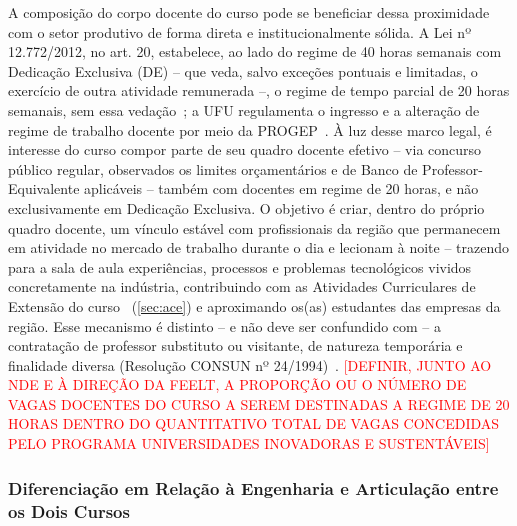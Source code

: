 A composição do corpo docente do curso pode se beneficiar dessa proximidade com o setor produtivo de forma direta e institucionalmente sólida. A Lei nº 12.772/2012, no art. 20, estabelece, ao lado do regime de 40 horas semanais com Dedicação Exclusiva (DE) -- que veda, salvo exceções pontuais e limitadas, o exercício de outra atividade remunerada --, o regime de tempo parcial de 20 horas semanais, sem essa vedação~\cite{lei_12772_2012}; a UFU regulamenta o ingresso e a alteração de regime de trabalho docente por meio da PROGEP~\cite{ufu_progep_regime_trabalho}. À luz desse marco legal, é interesse do curso compor parte de seu quadro docente efetivo -- via concurso público regular, observados os limites orçamentários e de Banco de Professor-Equivalente aplicáveis -- também com docentes em regime de 20 horas, e não exclusivamente em Dedicação Exclusiva. O objetivo é criar, dentro do próprio quadro docente, um vínculo estável com profissionais da região que permanecem em atividade no mercado de trabalho durante o dia e lecionam à noite -- trazendo para a sala de aula experiências, processos e problemas tecnológicos vividos concretamente na indústria, contribuindo com as Atividades Curriculares de Extensão do curso~\cite{ufu_congrad_177_2026} (\autoref{sec:ace}) e aproximando os(as) estudantes das empresas da região. Esse mecanismo é distinto -- e não deve ser confundido com -- a contratação de professor substituto ou visitante, de natureza temporária e finalidade diversa (Resolução CONSUN nº 24/1994)~\cite{ufu_consun_24_1994}. \textcolor{red}{[DEFINIR, JUNTO AO NDE E À DIREÇÃO DA FEELT, A PROPORÇÃO OU O NÚMERO DE VAGAS DOCENTES DO CURSO A SEREM DESTINADAS A REGIME DE 20 HORAS DENTRO DO QUANTITATIVO TOTAL DE VAGAS CONCEDIDAS PELO PROGRAMA UNIVERSIDADES INOVADORAS E SUSTENTÁVEIS]}

\subsubsection{Diferenciação em Relação à Engenharia e Articulação entre os Dois Cursos}


